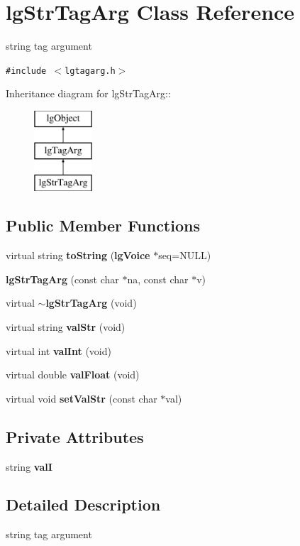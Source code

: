 \section{lg\-Str\-Tag\-Arg Class Reference}
\label{classlgStrTagArg}
string tag argument  


{\tt \#include $<$lgtagarg.h$>$}

Inheritance diagram for lg\-Str\-Tag\-Arg::\begin{figure}[H]
\begin{center}
\leavevmode
\includegraphics[height=3cm]{classlgStrTagArg}
\end{center}
\end{figure}
\subsection*{Public Member Functions}
\begin{CompactItemize}
\item 
virtual string {\bf to\-String} ({\bf lg\-Voice} $\ast$seq=NULL)
\item 
{\bf lg\-Str\-Tag\-Arg} (const char $\ast$na, const char $\ast$v)
\item 
virtual {\bf $\sim$lg\-Str\-Tag\-Arg} (void)
\item 
virtual string {\bf val\-Str} (void)
\item 
virtual int {\bf val\-Int} (void)
\item 
virtual double {\bf val\-Float} (void)
\item 
virtual void {\bf set\-Val\-Str} (const char $\ast$val)
\end{CompactItemize}
\subsection*{Private Attributes}
\begin{CompactItemize}
\item 
string {\bf val\-I}
\end{CompactItemize}


\subsection{Detailed Description}
string tag argument 



